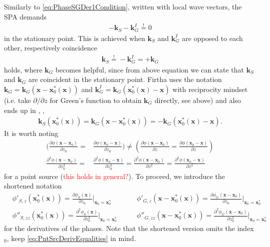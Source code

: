 \documentclass[a4paper,BCOR=15mm,10pt,twoside]{scrartcl}
\newcommand{\fscom}[2][red]{\textcolor{#1}{#2}}  %
\renewcommand{\vec}[1]{\mathbf{#1}}  %
\begin{document}
Similarly to \eqref{eq:PhaseSGDer1Condition}, written with local wave vectors, the SPA demands
\begin{align}
-\vec{k}_S - \vec{k}_G^I \stackrel{!}{=} 0
\end{align}
in the stationary point. This is achieved when $\vec{k}_S $ and $\vec{k}_G^I$ are opposed to each other, respectively coincidence
\begin{align}
\vec{k}_S \stackrel{!}{=} - \vec{k}_G^I = + \vec{k}_G
\end{align}
holds, where $\vec{k}_G$ becomes helpful, since from above equation we can state that $\vec{k}_S $ and $\vec{k}_G$ are coincident in the stationary point. Firtha uses the notation $\vec{k}_G = \vec{k}_G(\vec{x}-\vec{x}_0^*(\vec{x}))$ and $\vec{k}^I_G=\vec{k}_G(\vec{x}_0^*(\vec{x})-\vec{x})$ with reciprocity mindset (i.e. take $\partial / \partial z$ for Green's function to obtain $\vec{k}_G$ directly, see above) and also ends up in \cite[(7)]{Firtha2018}, \cite[(3.34)]{Firtha2018Diss}, \cite[Fig. 3.7]{Firtha2018Diss}
\begin{align}
\label{eq:SPA_condition_z}
\vec{k}_S(\vec{x}_0^*(\vec{x})) = \vec{k}_G(\vec{x}-\vec{x}_0^*(\vec{x})) = -\vec{k}_G(\vec{x}_0^*(\vec{x})-\vec{x}).
\end{align}
It is worth noting
\begin{align}
\label{eq:PntSrcDerivEqualities}
(\frac{\partial \phi(\vec{x}-\vec{x}_0)}{\partial z_0} = & \frac{\partial \phi(\vec{x}_0-\vec{x})}{\partial z_0}) \neq
(\frac{\partial \phi(\vec{x}-\vec{x}_0)}{\partial z} = \frac{\partial \phi(\vec{x}_0-\vec{x})}{\partial z})
\\
\frac{\partial^2 \phi(\vec{x}-\vec{x}_0)}{\partial z_0^2} =& \frac{\partial^2 \phi(\vec{x}_0-\vec{x})}{\partial z_0^2} = \frac{\partial^2 \phi(\vec{x}-\vec{x}_0)}{\partial z^2} = \frac{\partial^2 \phi(\vec{x}_0-\vec{x})}{\partial z^2}\nonumber
\end{align} 
for a point source (\fscom{this holds in general?}).
%
To proceed, we introduce the shortened notation 
%
\begin{align}
&\phi'_{S,z}(\vec{x}_0^*(\vec{x})) = \frac{\partial \phi_{S}(\vec{x})}{\partial z_0}\bigg|_{\vec{x}_0=\vec{x}_0^*}\qquad
&\phi'_{G,z}(\vec{x}-\vec{x}_0^*(\vec{x})) = \frac{\partial \phi_{G}(\vec{x}-\vec{x}_0)}{\partial z_0}\bigg|_{\vec{x}_0=\vec{x}_0^*} \\
&\phi''_{S,zz}(\vec{x}_0^*(\vec{x})) = \frac{\partial^2 \phi_{S}(\vec{x})}{\partial z_0^2}\bigg|_{\vec{x}_0=\vec{x}_0^*}\qquad
&\phi''_{G,zz}(\vec{x}-\vec{x}_0^*(\vec{x})) = \frac{\partial^2 \phi_{G}(\vec{x}-\vec{x}_0)}{\partial z_0^2}\bigg|_{\vec{x}_0=\vec{x}_0^*}
\end{align}
for the derivatives of the phases.
Note that the shortened version omits the index $_0$, keep \eqref{eq:PntSrcDerivEqualities} in mind.
\end{document}

